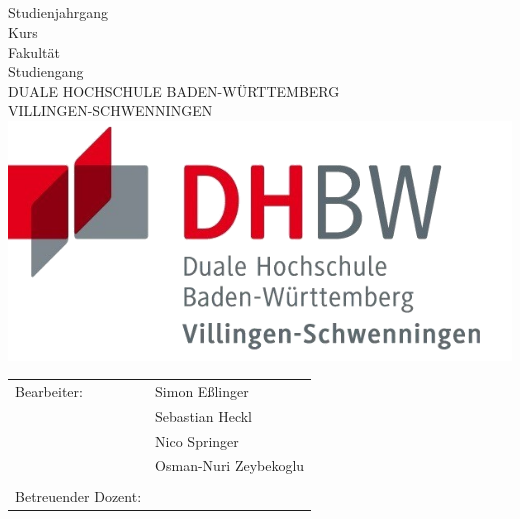 
\thispagestyle{empty}

\begin{center}
\vspace*{1cm} \ \\
{\fontsize{40}{48}\selectfont \bfseries \mytitlewithlinebreaks \\}
\vspace{0.75cm}
{\Large\bfseries \mysubtitlewithlinebreaks \\}
\vspace{1.5cm}
\mytexttype \\
Studienjahrgang \myyearofstudy \\
Kurs \mycourse \\
\vspace{1.5cm}
Fakultät \myfaculty \\
Studiengang \mycourseofstudy \\
DUALE HOCHSCHULE BADEN-WÜRTTEMBERG\\
VILLINGEN-SCHWENNINGEN\\
\vspace{2.5cm}
\includegraphics[width=.45\linewidth]{../assets/dhbw-vs-logo}
\end{center}
\begin{table}[b]
\centering
\begin{tabular}{ll}
Bearbeiter: 		&	Simon Eßlinger \\
                    &	Sebastian Heckl \\
                    &	Nico Springer \\
                    &	Osman-Nuri Zeybekoglu \\
                    & \\
Betreuender Dozent:	&	\mylecturer \\
\end{tabular}\\
\end{table}
